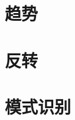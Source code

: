 \documentclass[openany]{book}
\begin{document}
\frontmatter

\mainmatter
\part{趋势}
\part{反转}

\part{模式识别}

\end{document}
